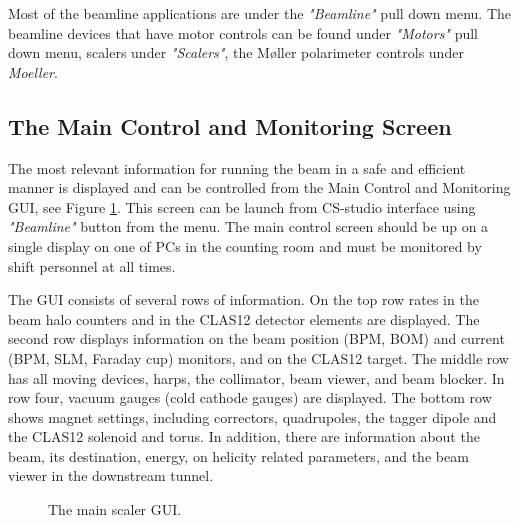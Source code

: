 \documentclass[12pt]{article}
\begin{document}
Most of the beamline applications are under the \emph{"Beamline"} pull down menu. The beamline devices that have motor controls can be found under \emph{"Motors"} pull down menu, scalers under \emph{"Scalers"}, the M{\o}ller polarimeter controls under \emph{Moeller}.  

\subsection{The Main Control and Monitoring Screen}
\indent

The most relevant information for running the beam in a safe and efficient manner is displayed and can be controlled from the Main Control and Monitoring GUI, see Figure \ref{fig:scaler}. This screen can be launch from CS-studio interface using \emph{"Beamline"} button from the menu. The main control screen should be up on a single display on one of PCs in the counting room and must be monitored by shift personnel at all times. 

The GUI consists of several rows of information. On the top row rates in the beam halo counters and in the CLAS12 detector elements are displayed. The second row displays information on the beam position (BPM, BOM) and current (BPM, SLM, Faraday cup) monitors, and on the CLAS12 target. The middle row has all moving devices, harps, the collimator, beam viewer, and beam blocker. In row four, vacuum gauges (cold cathode gauges) are displayed. The bottom row shows magnet settings, including correctors, quadrupoles, the tagger dipole and the CLAS12 solenoid and torus.  In addition, there are information about the beam, its destination, energy, on helicity related parameters, and the beam viewer in the downstream tunnel.


\begin{figure}[tbhp]
{\centering {} \par}
\caption{The main scaler GUI.}
 \label{fig:scaler}
\end{figure}
\end{document}
